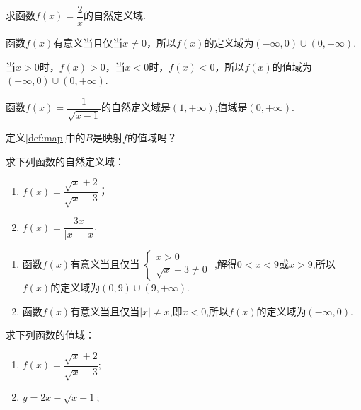 \documentclass[lang=cn,math=cm,chinesefont=nofont,11pt,scheme=chinese,twocol]{elegantbook}
\begin{document}
\begin{spacing}{2.0}
  \begin{example}
    求函数$f(x)=\dfrac{2}{x}$的自然定义域.
  \end{example}

  \begin{solution}
    函数$f(x)$有意义当且仅当$x\neq 0$，所以$f(x)$的定义域为$(-\infty,0)\cup(0,+\infty)$.

    当$x>0$时，$f(x)>0$，当$x<0$时，$f(x)<0$，所以$f(x)$的值域为$(-\infty,0)\cup(0,+\infty)$.
  \end{solution}
  
  \begin{example}
    函数$f(x)=\dfrac{1}{\sqrt{x-1}}$的自然定义域是$(1,+\infty)$,值域是$(0,+\infty)$.
  \end{example}

  \begin{exercise}
    定义\ref{def:map}中的$B$是映射$f$的值域吗？
  \end{exercise}
  
  \begin{example}
    求下列函数的自然定义域：
  \end{example}
  
  \begin{enumerate}
    \item $f(x)=\dfrac{\sqrt{x}+2}{\sqrt{x}-3}$；
    \item $f(x)=\dfrac{3x}{\left| x \right|-x}$.
  \end{enumerate}
\end{spacing}

\begin{solution}
  \begin{enumerate}
    \item 函数$f(x)$有意义当且仅当
     $\begin{cases}
        x>0
        \\\sqrt{x}-3\neq 0
      \end{cases}$
    ,解得$0<x<9$或$x>9$,所以$f(x)$的定义域为$(0,9)\cup (9,+\infty)$.

    \item 函数$f(x)$有意义当且仅当$\left| x \right|\neq x$,即$x<0$,所以$f(x)$的定义域为$(-\infty,0).$
  \end{enumerate}
\end{solution}

\begin{spacing}{2.0}
  \begin{example}
    求下列函数的值域：
  \end{example}
  
  \begin{enumerate}
    \item $f(x)=\dfrac{\sqrt{x}+2}{\sqrt{x}-3}$;
    \item $y=2x-\sqrt{x-1}$;
  \end{enumerate}
\end{spacing}
\end{document}
